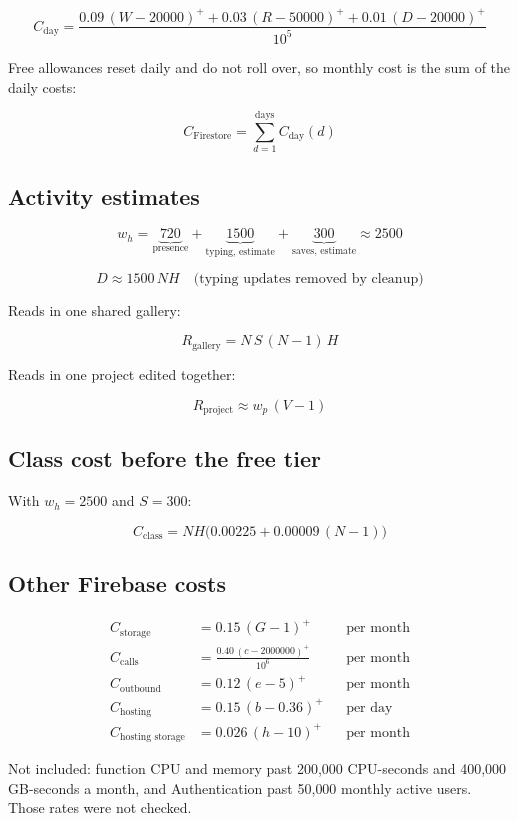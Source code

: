 \documentclass[11pt]{article}
\newcommand{\pos}[1]{\left(#1\right)^{+}}
\begin{document}
\[
C_{\text{day}} =
\frac{0.09\,\pos{W - 20000}
    + 0.03\,\pos{R - 50000}
    + 0.01\,\pos{D - 20000}}{10^{5}}
\]

Free allowances reset daily and do not roll over, so monthly cost is the sum
of the daily costs:

\[
C_{\text{Firestore}} = \sum_{d=1}^{\text{days}} C_{\text{day}}(d)
\]

\subsection{Activity estimates}

\[
w_h = \underbrace{720}_{\text{presence}}
    + \underbrace{1500}_{\text{typing, estimate}}
    + \underbrace{300}_{\text{saves, estimate}}
    \approx 2500
\]

\[
D \approx 1500\,N H \quad \text{(typing updates removed by cleanup)}
\]

Reads in one shared gallery:

\[
R_{\text{gallery}} = N\,S\,(N - 1)\,H
\]

Reads in one project edited together:

\[
R_{\text{project}} \approx w_p\,(V - 1)
\]

\subsection{Class cost before the free tier}

With $w_h = 2500$ and $S = 300$:

\[
C_{\text{class}} = N H \bigl(0.00225 + 0.00009\,(N - 1)\bigr)
\]

\subsection{Other Firebase costs}

\begin{align*}
C_{\text{storage}} &= 0.15\,\pos{G - 1} && \text{per month} \\
C_{\text{calls}} &= \frac{0.40\,\pos{c - 2000000}}{10^{6}} && \text{per month} \\
C_{\text{outbound}} &= 0.12\,\pos{e - 5} && \text{per month} \\
C_{\text{hosting}} &= 0.15\,\pos{b - 0.36} && \text{per day} \\
C_{\text{hosting storage}} &= 0.026\,\pos{h - 10} && \text{per month}
\end{align*}

Not included: function CPU and memory past 200{,}000 CPU-seconds and
400{,}000 GB-seconds a month, and Authentication past 50{,}000 monthly active
users. Those rates were not checked.
\end{document}
